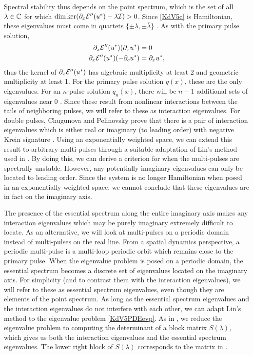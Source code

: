 \documentclass[10pt,reqno]{amsart}
\theoremstyle{plain}
\theoremstyle{definition}
\theoremstyle{remark}
\numberwithin{theorem}{section}
\numberwithin{equation}{section}
\begin{document}
Spectral stability thus depends on the point spectrum, which is the set of all $\lambda \in \mathbb{C}$ for which $\mathop\mathrm{dim}\nolimits \mathop\mathrm{ker}\nolimits(\partial_x \mathcal{E}''(u^*) - \lambda \mathcal{I}) > 0$. Since \cref{KdV5c} is Hamiltonian, these eigenvalues must come in quartets $\{ \pm \lambda, \pm \overline{\lambda}\}$ \cite[Proposition 5.1.2]{Kapitula2013}. As with the primary pulse solution,
\begin{align*}
\partial_x \mathcal{E}''(u^*) (\partial_x u^*) &= 0 \\
\partial_x \mathcal{E}''(u^*) (-\partial_c u^*) &= \partial_x u^*,
\end{align*}
thus the kernel of $\partial_x \mathcal{E}''(u^*)$ has algebraic multiplicity at least 2 and geometric multiplicity at least 1. For the primary pulse solution $q(x)$, these are the only eigenvalues. For an $n$-pulse solution $q_n(x)$, there will be $n-1$ additional sets of eigenvalues near 0 \cite{Sandstede1998}. Since these result from nonlinear interactions between the tails of neighboring pulses, we will refer to these as interaction eigenvalues. For double pulses, Chugunova and Pelinovsky prove that there is a pair of interaction eigenvalues which is either real or imaginary (to leading order) with negative Krein signature \cite[Theorem 2.3]{Pelinovsky2007}. Using an exponentially weighted space, we can extend this result to arbitrary multi-pulses through a suitable adaptation of Lin's method used in \cite{Sandstede1998}. By doing this, we can derive a criterion for when the multi-pulses are spectrally unstable. However, any potentially imaginary eigenvalues can only be located to leading order. Since the system is no longer Hamiltonian when posed in an exponentially weighted space, we cannot conclude that these eigenvalues are in fact on the imaginary axis.

The presence of the essential spectrum along the entire imaginary axis makes any interaction eigenvalues which may be purely imaginary extremely difficult to locate. As an alternative, we will look at multi-pulses on a periodic domain instead of multi-pulses on the real line. From a spatial dynamics perspective, a periodic multi-pulse is a multi-loop periodic orbit which remains close to the primary pulse. When the eigenvalue problem is posed on a periodic domain, the essential spectrum becomes a discrete set of eigenvalues located on the imaginary axis. For simplicity (and to contrast them with the interaction eigenvalues), we will refer to these as essential spectrum eigenvalues, even though they are elements of the point spectrum. As long as the essential spectrum eigenvalues and the interaction eigenvalues do not interfere with each other, we can adapt Lin's method to the eigenvalue problem \cref{KdV5PDEevp}. As in \cite{Sandstede1998}, we reduce the eigenvalue problem to computing the determinant of a block matrix $S(\lambda)$, which gives us both the interaction eigenvalues and the essential spectrum eigenvalues. The lower right block of $S(\lambda)$ corresponds to the matrix in \cite[Theorem 2]{Sandstede1998}.
\end{document}
